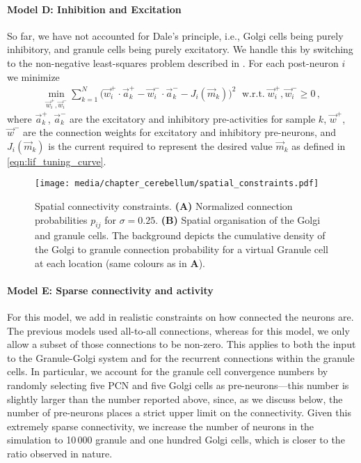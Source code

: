 \paragraph{Model D: Inhibition and Excitation}
So far, we have not accounted for Dale's principle, i.e., Golgi cells being purely inhibitory, and granule cells being purely excitatory.
We handle this by switching to the non-negative least-squares problem described in \citet{stoeckel2021passive}. For each post-neuron $i$ we minimize
\begin{align*}
    \min_{\vec w_i^+, \vec w_i^-} \sum_{k = 1}^N \big( \vec w_i^+ \cdot \vec a^+_k - \vec w_i^- \cdot \vec a^-_k - J_i(\vec m_k) \big)^2 \; \text{ w.r.t.} \; \vec w_i^+, \vec w_i^- \geq 0 \,,
\end{align*}
where $\vec a^+_k$, $\vec a^-_k$ are the excitatory and inhibitory pre-activities for sample $k$, $\vec w^+$, $\vec w^-$ are the connection weights for excitatory and inhibitory pre-neurons, and $J_i(\vec m_k)$ is the current required to represent the desired value $\vec m_k$ as defined in \cref{eqn:lif_tuning_curve}.

\begin{figure}[t]
    \centering
    \texttt{[image: media/chapter\_cerebellum/spatial\_constraints.pdf]}
    \caption[Spatial connectivity constraints.]{Spatial connectivity constraints. \textbf{(A)} Normalized connection probabilities $p_{ij}$ for $\sigma=0.25$. \textbf{(B)} Spatial organisation of the Golgi and granule cells. The background depicts the cumulative density of the Golgi to granule connection probability for a virtual Granule cell at each location (same colours as in \textbf{A}).}
    \label{fig:spatial_constraints}
\end{figure}

\paragraph{Model E: Sparse connectivity and activity}
For this model, we add in realistic constraints on how connected the neurons are.
The previous models used all-to-all connections, whereas for this model, we only allow a subset of those connections to be non-zero.
This applies to both the input to the Granule-Golgi system and for the recurrent connections within the granule cells.  
In particular, we account for the granule cell convergence numbers by randomly selecting five PCN and five Golgi cells as pre-neurons---this number is slightly larger than the number reported above, since, as we discuss below, the number of pre-neurons places a strict upper limit on the connectivity. Given this extremely sparse connectivity, we increase the number of neurons in the simulation to 10\,000 granule and one hundred Golgi cells, which is closer to the ratio observed in nature.

